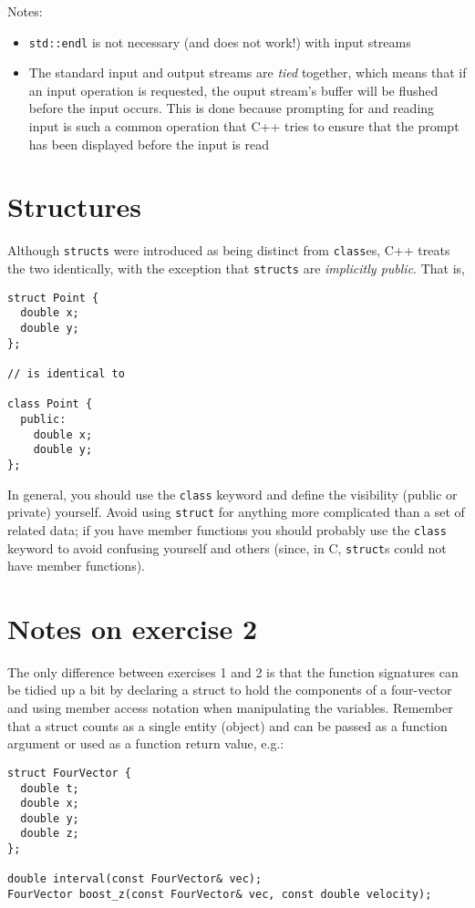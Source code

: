 \documentclass[a4paper]{scrartcl}
\begin{document}
Notes:
\begin{itemize}
	\item \verb|std::endl| is not necessary (and does not work!) with input streams

	\item The standard input and output streams are \emph{tied} together, which means that if an input operation is requested, the ouput stream's buffer will be flushed before the input occurs. This is done because prompting for and reading input is such a common operation that C++ tries to ensure that the prompt has been displayed before the input is read
\end{itemize}

\section{Structures}
Although \verb|structs| were introduced as being distinct from \verb|class|es, C++ treats the two identically, with the exception that \verb|structs| are \emph{implicitly public}. That is,

\begin{verbatim}
struct Point {
  double x;
  double y;
};

// is identical to

class Point {
  public:
    double x;
    double y;
};
\end{verbatim}

In general, you should use the \verb|class| keyword and define the visibility (public or private) yourself. Avoid using \verb|struct| for anything more complicated than a set of related data; if you have member functions you should probably use the \verb|class| keyword to avoid confusing yourself and others (since, in C, \verb|struct|s could not have member functions).

\section{Notes on exercise 2}
The only difference between exercises 1 and 2 is that the function signatures can be tidied up a bit by declaring a struct to hold the components of a four-vector and using member access notation when manipulating the variables. Remember that a struct counts as a single entity (object) and can be passed as a function argument or used as a function return value, e.g.:

\begin{verbatim}
struct FourVector {
  double t;
  double x;
  double y;
  double z;
};

double interval(const FourVector& vec);
FourVector boost_z(const FourVector& vec, const double velocity);
\end{verbatim}
\end{document}

